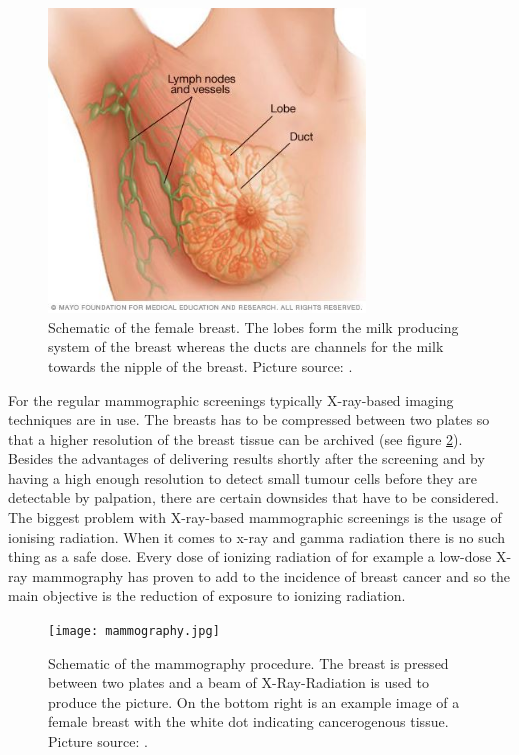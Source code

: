 \begin{figure}[H]
    \centering
    \includegraphics[width=0.75\textwidth]{Graphics/breast.jpg}
    \caption{Schematic of the female breast. The lobes form the milk producing system of the breast whereas the ducts are channels for the milk towards the nipple of the breast. Picture source: \cite{mayo-clinic}. }
    \label{anatomy_breast}
\end{figure}

\hspace{-1cm}
   
For the regular mammographic screenings typically X-ray-based imaging techniques are in use. The breasts has to be compressed between two plates so that a higher resolution of the breast tissue can be archived (see figure \ref{mammo_example_picture}). Besides the advantages of delivering results shortly after the screening and by having a high enough resolution to detect small tumour cells before they are detectable by palpation, there are certain downsides that have to be considered.
The biggest problem with X-ray-based mammographic screenings is the usage of ionising radiation. When it comes to x-ray and gamma radiation there is no such thing as a safe dose. Every dose of ionizing radiation of for example a low-dose X-ray mammography has proven to add to the incidence of breast cancer  \cite{Pauwels2015BreastRadiobiology} and so the main objective is the reduction of exposure to ionizing radiation.

\begin{figure}[H]
    \centering
    \texttt{[image: mammography.jpg]}
    \caption{Schematic of the mammography procedure. The breast is pressed between two plates and a beam of X-Ray-Radiation is used to produce the picture. On the bottom right is an example image of a female breast with the white dot indicating cancerogenous tissue. Picture source: \cite{NationalInstitutesofHealthNIH-NationalCancerInstituteNCIBreastTreatment}. }
    \label{mammo_example_picture}
\end{figure}

